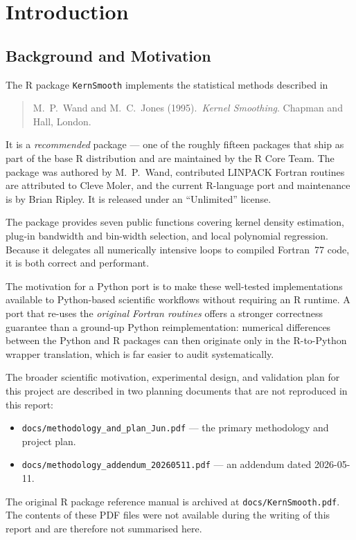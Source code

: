 \documentclass[12pt,a4paper]{article}
\begin{document}
\section{Introduction}

\subsection{Background and Motivation}

The R package \texttt{KernSmooth} implements the statistical methods described in
\begin{quote}
  M.~P.~Wand and M.~C.~Jones (1995).\ \textit{Kernel Smoothing}.
  Chapman and Hall, London.
\end{quote}
It is a \emph{recommended} package --- one of the roughly fifteen packages that ship as part of the base R distribution and are maintained by the R Core Team. The package was authored by M.~P.~Wand, contributed LINPACK Fortran routines are attributed to Cleve Moler, and the current R-language port and maintenance is by Brian Ripley. It is released under an ``Unlimited'' license.

The package provides seven public functions covering kernel density estimation, plug-in bandwidth and bin-width selection, and local polynomial regression. Because it delegates all numerically intensive loops to compiled Fortran~77 code, it is both correct and performant.

The motivation for a Python port is to make these well-tested implementations available to Python-based scientific workflows without requiring an R runtime. A port that re-uses the \emph{original Fortran routines} offers a stronger correctness guarantee than a ground-up Python reimplementation: numerical differences between the Python and R packages can then originate only in the R-to-Python wrapper translation, which is far easier to audit systematically.

The broader scientific motivation, experimental design, and validation plan for this project are described in two planning documents that are not reproduced in this report:
\begin{itemize}
  \item \texttt{docs/methodology\_and\_plan\_Jun.pdf} --- the primary methodology and project plan.
  \item \texttt{docs/methodology\_addendum\_20260511.pdf} --- an addendum dated 2026-05-11.
\end{itemize}
The original R package reference manual is archived at \texttt{docs/KernSmooth.pdf}. The contents of these PDF files were not available during the writing of this report and are therefore not summarised here.
\end{document}
